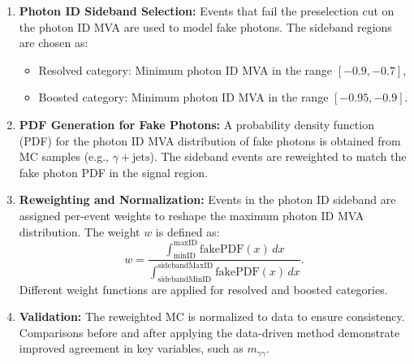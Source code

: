 \begin{enumerate}
    \item \textbf{Photon ID Sideband Selection:}
    Events that fail the preselection cut on the photon ID MVA are used to model fake photons. The sideband regions are chosen as:
    \begin{itemize}
        \item Resolved category: Minimum photon ID MVA in the range \([-0.9, -0.7]\),
        \item Boosted category: Minimum photon ID MVA in the range \([-0.95, -0.9]\).
    \end{itemize}

    \item \textbf{PDF Generation for Fake Photons:}
    A probability density function (PDF) for the photon ID MVA distribution of fake photons is obtained from MC samples (e.g.,
    \(\gamma + \text{jets}\)). The sideband events are reweighted to match the fake photon PDF in the signal region.

    \item \textbf{Reweighting and Normalization:}
    Events in the photon ID sideband are assigned per-event weights to reshape the maximum photon ID MVA distribution. The weight
     \(w\) is defined as:
    \begin{equation}
        w = \frac{\int_{\text{minID}}^{\text{maxID}} \text{fakePDF}(x) \, dx}
                 {\int_{\text{sidebandMinID}}^{\text{sidebandMaxID}} \text{fakePDF}(x) \, dx}.
    \end{equation}
    Different weight functions are applied for resolved and boosted categories.

    \item \textbf{Validation:}
    The reweighted MC is normalized to data to ensure consistency. Comparisons before and after applying the data-driven method demonstrate improved agreement in key variables, such as \(m_{\gamma\gamma}\).
\end{enumerate}

